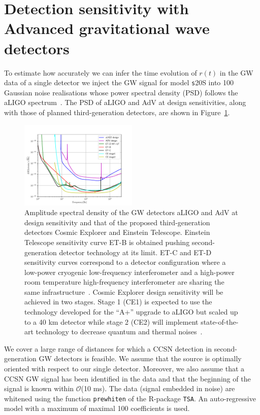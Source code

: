 \section{Detection sensitivity with Advanced gravitational wave detectors}
\label{sec:results}

To estimate how accurately we can infer the time evolution of $r(t)$ in the GW data of a single
detector we inject the GW signal for model {\texttt s20S} into 
100 Gaussian noise realisations whose power spectral density (PSD) follows the aLIGO
spectrum~\cite{aLIGOsens:2018}. The PSD of aLIGO and AdV at design sensitivities, along with those of planned third-generation detectors, are shown in Figure~\ref{fig:spectrum}. 

\begin{figure}[t]
 \centering
 \includegraphics[width=0.5\textwidth]{plots/spectrum}
 \caption{Amplitude spectral density of the GW detectors aLIGO and AdV at design sensitivity and that of the proposed third-generation detectors Cosmic Explorer and Einstein Telescope. Einstein Telescope sensitivity curve ET-B is obtained pushing second-generation detector technology at its limit. ET-C and ET-D sensitivity curves correspond to a detector configuration where a low-power cryogenic low-frequency interferometer and a high-power room temperature high-frequency interferometer are sharing the same infrastructure~\cite{Hild_2011}. Cosmic Explorer design sensitivity will be achieved in two stages. Stage 1 (CE1) is expected to use the technology developed for the ``A+'' upgrade to aLIGO but scaled up to a 40 km detector while stage 2 (CE2) will implement state-of-the-art technology to decrease quantum and thermal noises~\cite{reitze2019cosmic}. } \label{fig:spectrum}
\end{figure}

We cover a large range of distances for which a CCSN detection in second-generation GW detectors is feasible. We assume that the source is optimally oriented with respect to our single detector. Moreover, we also assume that a CCSN GW signal has been identified in the data and that the beginning of the signal is known within {$\mathcal O$}(10 ms). The data (signal embedded in noise) are whitened using the function {\tt prewhiten} of the R-package {\tt TSA}. An auto-regressive model with a maximum of maximal 100 coefficients is used.    

